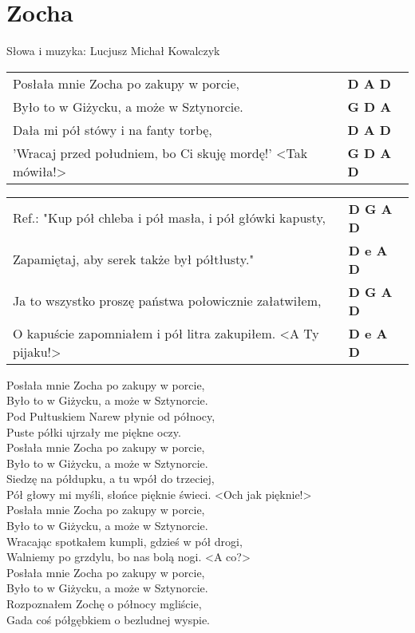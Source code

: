 \section{Zocha}

Słowa i muzyka: Lucjusz Michał Kowalczyk\\

\vspace{2em}
\begin{tabular}{@{}p{11cm}@{}l@{}}
Posłała mnie Zocha po zakupy w porcie, & \bfseries  D A D \\
Było to w Giżycku, a może w Sztynorcie. & \bfseries G D A \\
Dała mi pół stówy i na fanty torbę, & \bfseries  D A D \\
'Wracaj przed południem, bo Ci skuję mordę!'  <Tak mówiła!>  & \bfseries G D A D \\
\end{tabular}

\vspace{1em}
\begin{tabular}{@{}p{11cm}@{}l@{}}
Ref.: "Kup pół chleba i pół masła, i pół główki kapusty, & \bfseries  D G A D \\
Zapamiętaj, aby serek także był półtłusty." & \bfseries  D e A D \\
Ja to wszystko proszę państwa połowicznie załatwiłem, & \bfseries  D G A D \\
O kapuście zapomniałem i pół litra zakupiłem.  <A Ty pijaku!> & \bfseries  D e A D \\
\end{tabular}

\vspace{1em}
Posłała mnie Zocha po zakupy w porcie, \\
Było to w Giżycku, a może w Sztynorcie. \\
Pod Pułtuskiem Narew płynie od północy, \\
Puste półki ujrzały me piękne oczy. \\

\vspace{-1em}
Posłała mnie Zocha po zakupy w porcie, \\
Było to w Giżycku, a może w Sztynorcie. \\
Siedzę na półdupku, a tu wpół do trzeciej, \\
Pół głowy mi myśli, słońce pięknie świeci.  <Och jak pięknie!> \\

Posłała mnie Zocha po zakupy w porcie, \\
Było to w Giżycku, a może w Sztynorcie. \\
Wracając spotkałem kumpli, gdzieś w pół drogi, \\
Walniemy po grzdylu, bo nas bolą nogi.  <A co?> \\

Posłała mnie Zocha po zakupy w porcie, \\
Było to w Giżycku, a może w Sztynorcie. \\
Rozpoznałem Zochę o północy mgliście, \\
Gada coś półgębkiem o bezludnej wyspie.